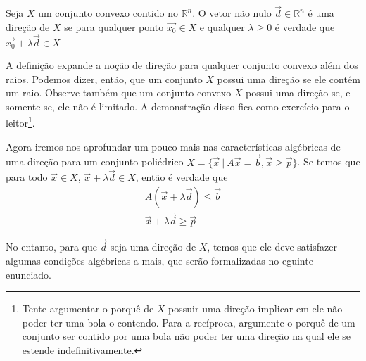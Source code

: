 \begin{def:direção}
	Seja $X$ um conjunto convexo contido no $\mathbb{R}^n$. O vetor não nulo
	$\vec{d} \in \mathbb{R}^n$ é uma direção de $X$ se para qualquer ponto
	$\vec{x_0} \in X$ e qualquer $\lambda \geq 0$ é verdade que
	$\vec{x_0} + \lambda \vec{d} \in X$
\end{def:direção}

A definição expande a noção de direção para qualquer conjunto convexo além dos
raios. Podemos dizer, então, que um conjunto $X$ possui uma direção se ele contém
um raio. Observe também que um conjunto convexo $X$ possui uma direção se, e
somente se, ele não é limitado. A demonstração disso fica como exercício para o
leitor\footnote{Tente argumentar o porquê de $X$ possuir uma direção implicar em
ele não poder ter uma bola o contendo. Para a recíproca, argumente o porquê de
um conjunto ser contido por uma bola não poder ter uma direção na qual ele se
estende indefinitivamente.}.

Agora iremos nos aprofundar um pouco mais nas características algébricas de uma
direção para um conjunto poliédrico $X = \{\vec{x}\ |\ A\vec{x} = \vec{b}, \vec{x} \geq \vec p\}$.
Se temos que para todo $\vec{x} \in X$, $\vec{x} + \lambda \vec{d} \in X$,
então é verdade que
\begin{gather*}
	A (\vec{x} + \lambda \vec{d}) \leq \vec{b} \\
	\vec{x} + \lambda \vec{d} \geq \vec p
\end{gather*}

No entanto, para que $\vec{d}$ seja uma direção de $X$, temos que ele deve
satisfazer algumas condições algébricas a mais, que serão formalizadas no
eguinte enunciado.

